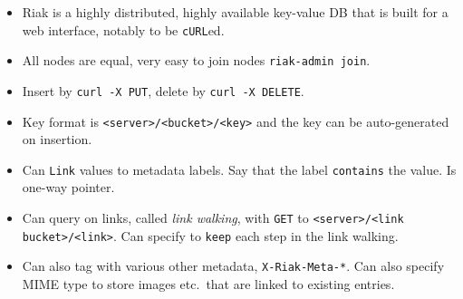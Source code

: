\documentclass[10pt]{article}
\begin{document}
\begin{itemize}
    \item Riak is a highly distributed, highly available key-value DB that is
        built for a web interface, notably to be \lstinline{cURL}ed.
    \item All nodes are equal, very easy to join nodes
        \lstinline{riak-admin join}.
    \item Insert by \lstinline{curl -X PUT}, delete by
        \lstinline{curl -X DELETE}.
    \item Key format is \lstinline{<server>/<bucket>/<key>} and the key can be
        auto-generated on insertion.
    \item Can \lstinline{Link} values to metadata labels. Say that the label
        \lstinline{contains} the value. Is one-way pointer.
    \item Can query on links, called \emph{link walking}, with \lstinline{GET}
        to \lstinline{<server>/<link bucket>/<link>}. Can specify to
        \lstinline{keep} each step in the link walking.
    \item Can also tag with various other metadata, \lstinline{X-Riak-Meta-*}.
        Can also specify MIME type to store images etc.\ that are linked to
        existing entries.
\end{itemize}
\end{document}
